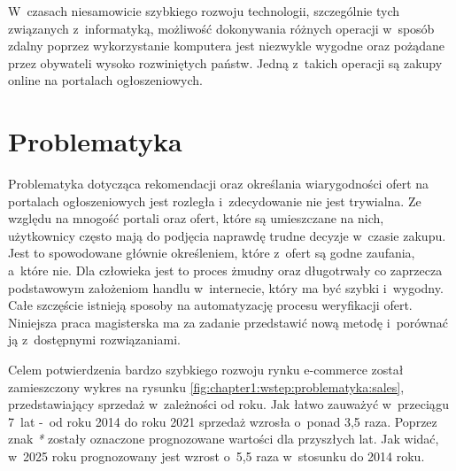 \documentclass[../Kamil_Kowalewski_Main.tex]{subfiles}
\begin{document}
 {

    W~czasach niesamowicie szybkiego rozwoju technologii, szczególnie tych związanych
    z~informatyką, możliwość dokonywania różnych operacji w~sposób zdalny poprzez
    wykorzystanie komputera jest niezwykle wygodne oraz pożądane przez obywateli wysoko
    rozwiniętych państw. Jedną z~takich operacji są zakupy online na portalach
    ogłoszeniowych.

    \section{Problematyka}
    \label{chapter1:wstep:problematyka} {
        Problematyka dotycząca rekomendacji oraz określania wiarygodności ofert na
        portalach ogłoszeniowych jest rozległa i~zdecydowanie nie jest trywialna. Ze
        względu na mnogość portali oraz ofert, które są umieszczane na nich, użytkownicy
        często mają do podjęcia naprawdę trudne decyzje w~czasie zakupu. Jest to
        spowodowane głównie określeniem, które z~ofert są godne zaufania, a~które nie.
        Dla człowieka jest to proces żmudny oraz długotrwały co zaprzecza podstawowym
        założeniom handlu w~internecie, który ma być szybki i~wygodny. Całe szczęście
        istnieją sposoby na automatyzację procesu weryfikacji ofert. Niniejsza praca
        magisterska ma za zadanie przedstawić nową metodę i~porównać ją z~dostępnymi
        rozwiązaniami.

        Celem potwierdzenia bardzo szybkiego rozwoju rynku e-commerce został
        zamieszczony wykres na rysunku \ref{fig:chapter1:wstep:problematyka:sales},
        przedstawiający sprzedaż w~zależności od roku. Jak łatwo zauważyć
        w~przeciągu 7~lat -~od roku 2014 do roku 2021 sprzedaż wzrosła o~ponad 3,5 raza.
        Poprzez znak \textit{*} zostały oznaczone prognozowane wartości dla przyszłych
        lat. Jak widać, w~2025 roku prognozowany jest wzrost o~5,5 raza w~stosunku do 2014
        roku.

}}
\end{document}
